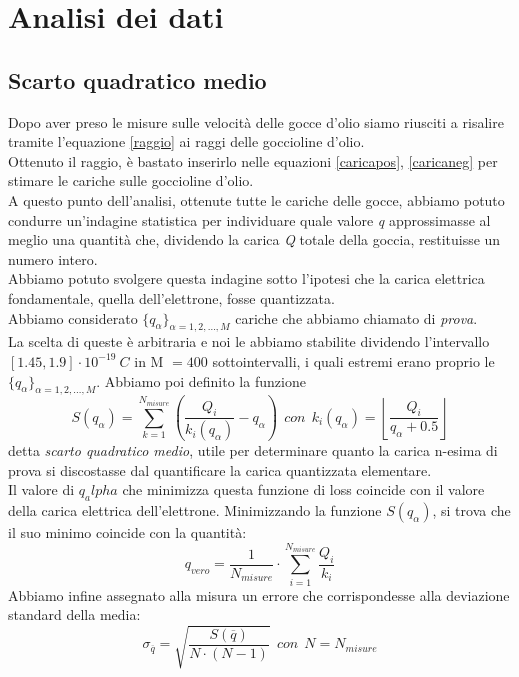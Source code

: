 
\section{Analisi dei dati}
\subsection{Scarto quadratico medio}
    Dopo aver preso le misure sulle velocità delle gocce d'olio siamo riusciti a risalire tramite l'equazione \eqref{raggio} ai raggi delle goccioline d'olio.\\
    Ottenuto il raggio, è bastato inserirlo nelle equazioni \eqref{caricapos}, \eqref{caricaneg} per stimare le cariche sulle goccioline d'olio.\\
    A questo punto dell'analisi, ottenute tutte le cariche delle gocce, abbiamo potuto condurre un'indagine statistica per individuare quale valore \textit{q} approssimasse al meglio una quantità che, dividendo la carica \textit{Q} totale della goccia, restituisse un numero intero.\\
    Abbiamo potuto svolgere questa indagine sotto l'ipotesi che la carica elettrica fondamentale, quella dell'elettrone, fosse quantizzata.\\
    Abbiamo considerato $\{q_\alpha\}_{\alpha=1,2,\dots,M}$ cariche che abbiamo chiamato di \textit{prova}.\\
    La scelta di queste è arbitraria e noi le abbiamo stabilite dividendo l'intervallo $\left[1.45,1.9\right]\cdot10^{-19}~C$ in M $=400$ sottointervalli, i quali estremi erano proprio le $\{q_\alpha\}_{\alpha=1,2,\dots,M}$.
    Abbiamo poi definito la funzione 
        $$S(q_\alpha)=\sum_{k=1}^{N_{misure}} \left( \frac{Q_i}{k_i(q_\alpha)} - q_\alpha\right) ~~con~~ k_i(q_\alpha)=\left\lfloor \frac{Q_i}{q_\alpha + 0.5} \right\rfloor$$
    detta \textit{scarto quadratico medio}, utile per determinare quanto la carica n-esima di prova si discostasse dal quantificare la carica quantizzata elementare.\\
    Il valore di $q_alpha$ che minimizza questa funzione di loss coincide con il valore della carica elettrica dell'elettrone.
    Minimizzando la funzione $S(q_\alpha)$, si trova che il suo minimo coincide con la quantità:
        $$q_{vero}=\frac{1}{N_{misure}}\cdot \sum_{i=1}^{N_{misure}} \frac{Q_i}{k_i}$$
    Abbiamo infine assegnato alla misura un errore che corrispondesse alla deviazione standard della media:
        $$\sigma_{\overline{q}} = \sqrt{\frac{S(\overline{q})}{N \cdot (N-1)}} ~~con~~ N=N_{misure}$$

